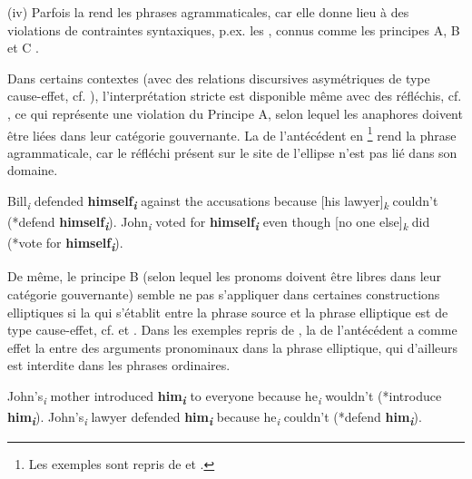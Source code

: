 (iv) Parfois la  rend les phrases agrammaticales, car elle donne lieu à des violations de contraintes syntaxiques, p.ex. les , connus comme les principes A, B et C \citep{Lobeck1995}.

Dans certains contextes (avec des relations discursives asymétriques de type cause-effet, cf. \citealt{Kehler2000}), l’interprétation stricte est disponible même avec des réfléchis, cf. \citet{Hardt1993}, ce qui représente une violation du Principe A, selon lequel les anaphores doivent être liées dans leur catégorie gouvernante. La  de l’antécédent en \footnote{Les exemples sont repris de \citet{Kehler2000} et \citet{Dalrymple2005}.} rend la phrase agrammaticale, car le réfléchi présent sur le site de l’ellipse n’est pas lié dans son domaine. 

\ea \label{ch1:ex132}
\ea  Bill\textit{\textsubscript{i}} defended \textbf{himself}\textbf{\textit{\textsubscript{i}}} against the accusations because [his lawyer]\textit{\textsubscript{k}} couldn’t (*defend \textbf{himself}\textbf{\textit{\textsubscript{i}}}). 
\ex  John\textit{\textsubscript{i}} voted for \textbf{himself}\textbf{\textit{\textsubscript{i}}} even though [no one else]\textit{\textsubscript{k}} did (*vote for \textbf{himself}\textbf{\textit{\textsubscript{i}}}).
\z
\z

De même, le principe B (selon lequel les pronoms doivent être libres dans leur catégorie gouvernante) semble ne pas s’appliquer dans certaines constructions elliptiques si la  qui s’établit entre la phrase source et la phrase elliptique est de type cause-effet, cf. \citet{Kehler1994} et \citet{Dalrymple2005}. Dans les exemples  repris de \citet{Kehler2000}, la  de l’antécédent a comme effet la  entre des arguments pronominaux dans la phrase elliptique,  qui d’ailleurs est interdite dans les phrases ordinaires.

\ea \label{ch1:ex133}
\ea  John’s\textit{\textsubscript{i}} mother introduced \textbf{him}\textbf{\textit{\textsubscript{i}}} to everyone because he\textit{\textsubscript{i}} wouldn’t (*introduce \textbf{him}\textbf{\textit{\textsubscript{i}}}). 
\ex  John’s\textit{\textsubscript{i}} lawyer defended \textbf{him}\textbf{\textit{\textsubscript{i}}} because he\textit{\textsubscript{i}} couldn’t (*defend \textbf{him}\textbf{\textit{\textsubscript{i}}}).
\z
\z

